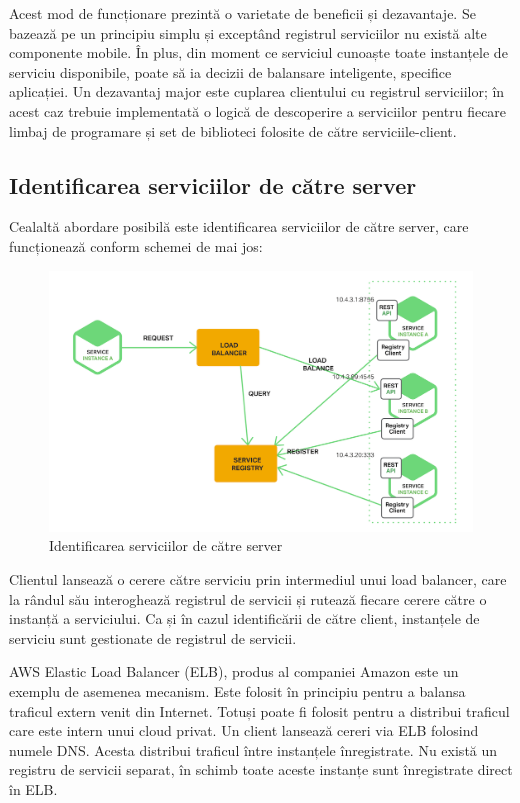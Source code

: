 \documentclass[12pt, a4paper, oneside, romanian]{teza-upb}
\begin{document}
Acest mod de funcționare prezintă o varietate de beneficii și dezavantaje. Se bazează pe un principiu simplu și exceptând registrul serviciilor nu există alte componente mobile. În plus, din moment ce serviciul cunoaște toate instanțele de serviciu disponibile, poate să ia decizii de balansare inteligente, specifice aplicației. Un dezavantaj major este cuplarea clientului cu registrul serviciilor; în acest caz trebuie implementată o logică de descoperire a serviciilor pentru fiecare limbaj de programare și set de biblioteci folosite de către serviciile-client. 

\subsection{Identificarea serviciilor de către server}

Cealaltă abordare posibilă este identificarea serviciilor de către server, care funcționează conform schemei de mai jos:

\begin{figure}[ht]
\centering
\includegraphics[scale=0.3]{img/Richardson-microservices-part4-3_server-side-pattern.png}
\caption{Identificarea serviciilor de către server}
\label{fig:arhi_componente}
\end{figure}

Clientul lansează o cerere către serviciu prin intermediul unui load balancer, care la rândul său interoghează registrul de servicii și rutează fiecare cerere către o instanță a serviciului. Ca și în cazul identificării de către client, instanțele de serviciu sunt gestionate de registrul de servicii. 

AWS Elastic Load Balancer (ELB), produs al companiei Amazon este un exemplu de asemenea mecanism. Este folosit în principiu pentru a balansa traficul extern venit din Internet. Totuși poate fi folosit pentru a distribui traficul care este intern unui cloud privat. Un client lansează cereri via ELB folosind numele DNS. Acesta distribui traficul între instanțele înregistrate. Nu există un registru de servicii separat, în schimb toate aceste instanțe sunt înregistrate direct în ELB.
\end{document}
